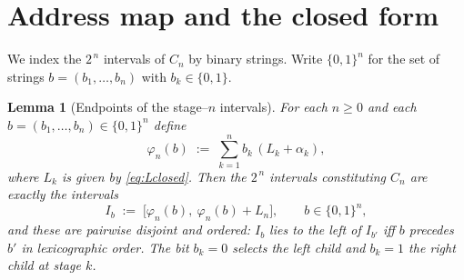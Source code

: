 \documentclass[11pt]{article}
\newtheorem{lemma}{Lemma}
\theoremstyle{definition}
\theoremstyle{remark}
\begin{document}
\section{Address map and the closed form}

We index the $2^{\,n}$ intervals of $C_n$ by binary strings. Write
$\{0,1\}^{n}$ for the set of strings $b=(b_1,\dots,b_n)$ with $b_k\in\{0,1\}$.

\begin{lemma}[Endpoints of the stage--$n$ intervals]\label{lem:address}
For each $n\ge0$ and each $b=(b_1,\dots,b_n)\in\{0,1\}^{n}$ define
\begin{equation}\label{eq:phi}
\varphi_n(b)\;:=\;\sum_{k=1}^{n}b_k\,(L_k+\alpha_k),
\end{equation}
where $L_k$ is given by \eqref{eq:Lclosed}. Then the $2^{\,n}$ intervals
constituting $C_n$ are exactly the intervals
\[
I_b\;:=\;\bigl[\varphi_n(b),\ \varphi_n(b)+L_n\bigr],\qquad b\in\{0,1\}^{n},
\]
and these are pairwise disjoint and ordered: $I_b$ lies to the left of $I_{b'}$
iff $b$ precedes $b'$ in lexicographic order. The bit $b_k=0$ selects the left
child and $b_k=1$ the right child at stage $k$.
\end{lemma}
\end{document}
